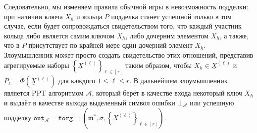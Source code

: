 \documentclass{mrl}
\theoremstyle{definition}
\numberwithin{theorem}{subsection}
\newcommand{\adversary}{\mathcal{A}}
\newcommand{\m}{\mathfrak{m}}
\begin{document}
Следовательно, мы изменяем правила обычной игры в невозможность подделки: при наличии ключа $X_h$ и кольца $\underline{P}$ подделка станет успешной только в том случае, если будет сопровождаться свидетельством того, что каждый участник кольца либо является самим ключом $X_h$, либо дочерним элементом $X_h$, а также, что в $\underline{P}$ присутствует по крайней мере один дочерний элемент $X_h$. Злоумышленник может просто создать свидетельство этих отношений, представив агрегируемые наборы $\left\{\underline{X}^{(\ell)}\right\}_{\ell \in [r]}$ таким образом, чтобы $X_h \in \underline{X}^{(\ell)}$ и $P_\ell = \Phi(\underline{X}^{(\ell)})$ для каждого $1 \leq \ell \leq r$. В дальнейшем злоумышленник является PPT алгоритмом $\adversary$, который берёт в качестве входа некоторый ключ $X_h$ и выдаёт в качестве выхода выделенный символ ошибки $\bot_\adversary$ или успешную подделку $\texttt{out}_{\adversary} = \texttt{forg} = (\m^*, \sigma, \left\{\underline{X}^{(\ell)}\right\}_{\ell \in [r]})$.






\end{document}
